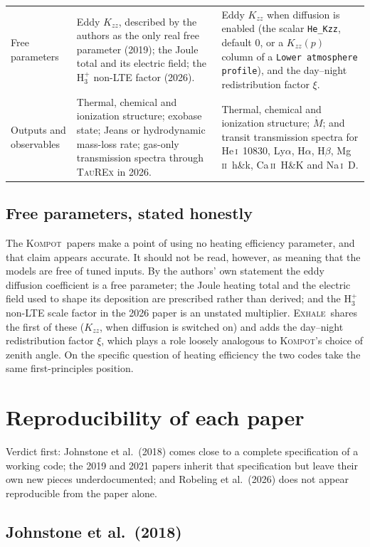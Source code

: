 \documentclass{my_memo}
\newcommand{\EXHALE}{\textsc{Exhale}}
\newcommand{\Kompot}{\textsc{Kompot}}
\newcommand{\Mdot}{\dot{M}}
\newcommand{\Lya}{Ly$\alpha$}
\newcommand{\Ha}{H$\alpha$}
\newcommand{\Kzz}{K_{zz}}
\begin{document}
{\begin{longtable}{@{}L{0.155\textwidth}L{0.39\textwidth}L{0.39\textwidth}@{}}
Free parameters &
Eddy $\Kzz$, described by the authors as the only real free parameter (2019); the Joule total and
its electric field; the H$_3^+$ non-LTE factor (2026). &
Eddy $\Kzz$ when diffusion is enabled (the scalar \texttt{He\_Kzz}, default 0, or a
$\Kzz(p)$ column of a \texttt{Lower atmosphere profile}), and the day--night redistribution
factor $\xi$. \\

Outputs and observables &
Thermal, chemical and ionization structure; exobase state; Jeans or hydrodynamic mass-loss rate;
gas-only transmission spectra through \textsc{TauREx} in 2026. &
Thermal, chemical and ionization structure; $\Mdot$; and transit transmission spectra for
He\,\textsc{i}~10830, \Lya, \Ha, H$\beta$, Mg\,\textsc{ii}~h\&k, Ca\,\textsc{ii}~H\&K and
Na\,\textsc{i}~D. \\
\end{longtable}}

\subsection{Free parameters, stated honestly}

The \Kompot\ papers make a point of using no heating efficiency parameter, and that claim appears
accurate. It should not be read, however, as meaning that the models are free of tuned inputs. By
the authors' own statement the eddy diffusion coefficient is a free parameter; the Joule heating
total and the electric field used to shape its deposition are prescribed rather than derived; and
the H$_3^+$ non-LTE scale factor in the 2026 paper is an unstated multiplier. \EXHALE\ shares the
first of these ($\Kzz$, when diffusion is switched on) and adds the day--night redistribution
factor $\xi$, which plays a role loosely analogous to \Kompot's choice of zenith angle. On the
specific question of heating efficiency the two codes take the same first-principles position.

\section{Reproducibility of each paper}

Verdict first: Johnstone et al.\ (2018) comes close to a complete specification of a working code;
the 2019 and 2021 papers inherit that specification but leave their own new pieces
underdocumented; and Robeling et al.\ (2026) does not appear reproducible from the paper alone.

\subsection{Johnstone et al.\ (2018)}
\end{document}
